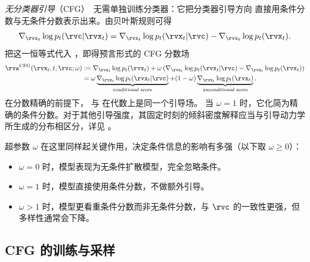 \emph{无分类器引导}（CFG）~\citep{ho2021classifier}无需单独训练分类器：它把分类器引导方向
直接用条件分数与无条件分数表示出来。由贝叶斯规则可得
\begin{align}
\nabla_{\rvx_t}\log p_t(\rvc|\rvx_t)
=
\nabla_{\rvx_t}\log p_t(\rvx_t|\rvc)
-
\nabla_{\rvx_t}\log p_t(\rvx_t).
\end{align}
把这一恒等式代入 ，即得预言形式的 CFG 分数场
\begin{align}\label{eq:cfg-model}
\rvs^{\mathrm{CFG}}(\rvx_t,t,\rvc;\omega)
&:=
\nabla_{\rvx_t}\log p_t(\rvx_t)
+
\omega
\left(
\nabla_{\rvx_t}\log p_t(\rvx_t|\rvc)
-
\nabla_{\rvx_t}\log p_t(\rvx_t)
\right)
\nonumber\\
&=
\omega
\underbrace{\nabla_{\rvx_t}\log p_t(\rvx_t|\rvc)}_{\text{conditional score}}
+
(1-\omega)
\underbrace{\nabla_{\rvx_t}\log p_t(\rvx_t)}_{\text{unconditional score}}.
\end{align}
在分数精确的前提下， 与  在代数上是同一个引导场。
当 $\omega=1$ 时，它化简为精确的条件分数。对于其他引导强度，其固定时刻的倾斜密度解释应当与引导动力学所生成的分布相区分，详见
。

超参数 $\omega$ 在这里同样起关键作用，决定条件信息的影响有多强（以下取 $\omega \ge 0$）：
\begin{itemize}
    \item $\omega = 0$ 时，模型表现为无条件扩散模型，完全忽略条件。
    \item $\omega = 1$ 时，模型直接使用条件分数，不做额外引导。
    \item $\omega > 1$ 时，模型更看重条件分数而非无条件分数，与 $\rvc$ 的一致性更强，但多样性通常会下降。
\end{itemize}

\subsection{CFG 的训练与采样}


